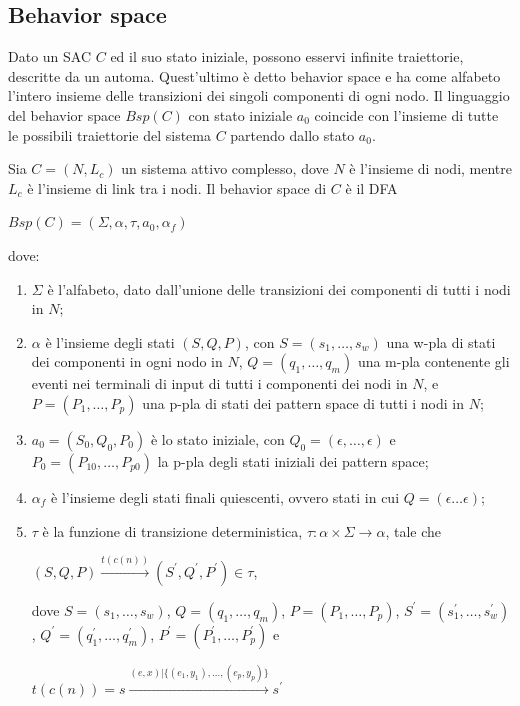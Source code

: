 \subsection{Behavior space}
Dato un SAC $C$ ed il suo stato iniziale, possono esservi infinite traiettorie, descritte da un automa. 
Quest'ultimo è detto behavior space e ha come alfabeto l'intero insieme delle transizioni dei singoli componenti di ogni nodo.
Il linguaggio del behavior space $Bsp(C)$ con stato iniziale $a_0$ coincide con l'insieme di tutte le possibili traiettorie del sistema $C$ partendo dallo stato $a_0$. 
\begin{defn}
Sia $C = (N,L_c)$ un sistema attivo complesso, dove $N$ è l'insieme di nodi, mentre $L_c$ è l'insieme di link tra i nodi. Il behavior space di $C$ è il DFA
\begin{center}
	$Bsp(C) = (\Sigma,\alpha,\tau,a_0,\alpha_f)$
\end{center}
dove:
\begin{enumerate}
\item $\Sigma$ è l'alfabeto, dato dall'unione delle transizioni dei componenti di tutti i nodi in $N$;
\item $\alpha$  è l'insieme degli stati $(S,Q,P)$, con $S = (s_1,\ldots,s_w)$ una w-pla di stati dei componenti in ogni nodo in $N$, $Q = (q_1, \ldots,q_m)$ una m-pla contenente gli eventi nei terminali di input di tutti i componenti dei nodi in $N$, e $P = (P_1, \ldots, P_p)$ una p-pla di stati dei pattern space di tutti i nodi in $N$;
\item $a_0 = (S_0,Q_0,P_0)$ è lo stato iniziale, con $Q_0 = (\epsilon, \ldots, \epsilon)$ e $P_0 = (P_{10}, \ldots, P_{p0})$ la p-pla degli stati iniziali dei pattern space;
\item $\alpha_f$ è l'insieme degli stati finali quiescenti, ovvero stati in cui $Q = (\epsilon \ldots \epsilon)$;
\item $\tau$ è la funzione di transizione deterministica, $\tau: \alpha \times \Sigma \rightarrow \alpha$, tale che 
\begin{center}
$(S,Q,P) \xrightarrow{t(c(n))} (S^\prime, Q^\prime, P^\prime) \in \tau$,
\end{center}
dove $S = (s_1, \ldots,s_w)$, $Q = (q_1, \ldots,q_m)$, $P = (P_1, \ldots, P_p)$, $S^\prime = (s^\prime_1, \ldots,s^\prime_w)$, $Q^\prime = (q^\prime_1, \ldots,q^\prime_m)$, $P^\prime = (P_1^\prime, \ldots, P_p^\prime)$ e
\begin{center}
$t(c(n)) = s \xrightarrow{(e,x) | \{(e_1,y_1), \ldots, (e_p,y_p)\}} s^\prime$
\end{center}

\end{enumerate}
\end{defn}

